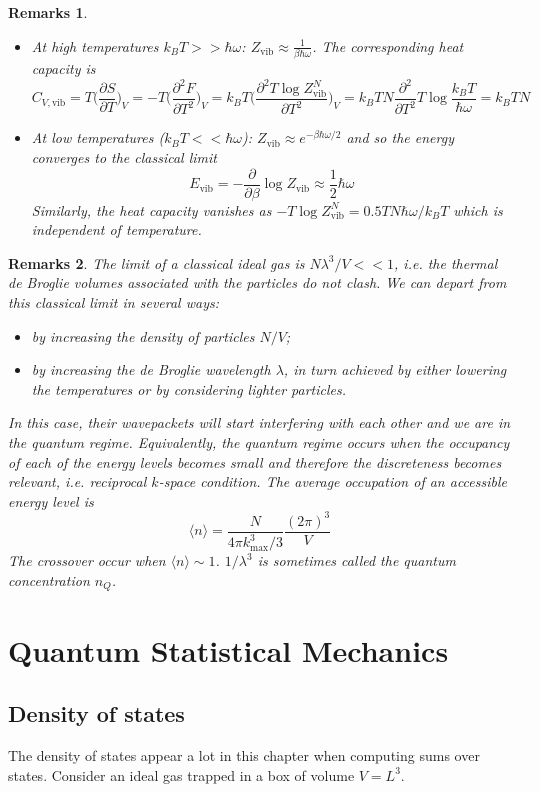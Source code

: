 \documentclass[a4paper]{article}
\newtheorem{remarks}{Remarks}[section]
\theoremstyle{new}
\begin{document}
\begin{remarks}
\begin{itemize}
    \item At high temperatures $k_BT>>\hbar\omega$: $Z_{\text{vib}}\approx\frac{1}{\beta\hbar\omega}$. The corresponding heat capacity is
  $$C_{V,\text{vib}}=T\bigg(\frac{\partial S}{\partial T}\bigg)_V=-T\bigg(\frac{\partial^2F}{\partial T^2}\bigg)_V=k_BT\bigg(\frac{\partial^2T\log Z_{\text{vib}}^N}{\partial T^2}\bigg)_V=k_BTN\frac{\partial^2}{\partial T^2}T\log\frac{k_BT}{\hbar\omega}=k_BTN$$  
  \item At low temperatures ($k_BT<<\hbar\omega$): $Z_{\text{vib}}\approx e^{-\beta\hbar\omega/2}$ and so the energy converges to the classical limit
  $$E_{\text{vib}}=-\frac{\partial}{\partial\beta}\log Z_{\text{vib}}\approx\frac{1}{2}\hbar\omega$$
  Similarly, the heat capacity vanishes as $-T\log Z_{\text{vib}}^N=0.5TN\hbar\omega/k_BT$ which is independent of temperature.
\end{itemize}
\end{remarks}
\begin{remarks}
The limit of a classical ideal gas is $N\lambda^3/V<<1$, i.e. the thermal de Broglie volumes associated with the particles do not clash. We can depart from this classical limit in several ways:
\begin{itemize}
    \item by increasing the density of particles $N/V$;
    \item by increasing the de Broglie wavelength $\lambda$, in turn achieved by either lowering the temperatures or by considering lighter particles.
\end{itemize}
In this case, their wavepackets will start interfering with each other and we are in the quantum regime. Equivalently, the quantum regime occurs when the occupancy of each of the energy levels becomes small and therefore the discreteness becomes relevant, i.e. reciprocal $k$-space condition. The average occupation of an accessible energy level is
$$\langle n\rangle=\frac{N}{4\pi k_{\text{max}}^3/3}\frac{(2\pi)^3}{V}$$
The crossover occur when $\langle n\rangle\sim 1$. $1/\lambda^3$ is sometimes called the quantum concentration $n_Q$.
\end{remarks}
\newpage
\section{Quantum Statistical Mechanics}
\subsection{Density of states}
The density of states appear a lot in this chapter when computing sums over states. Consider an ideal gas trapped in a box of volume $V=L^3$.
\end{document}
